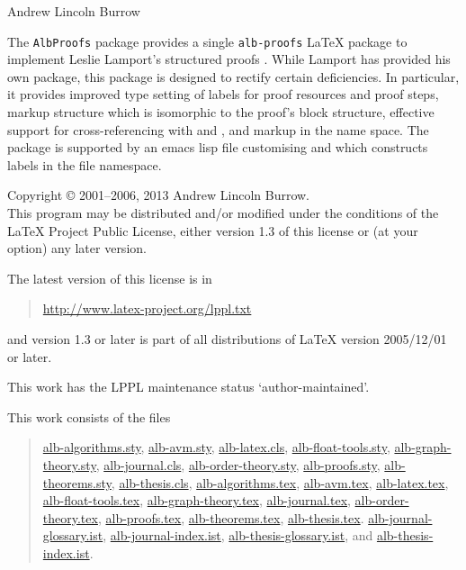 \documentclass[11pt,a4paper,oneside,titlepage]{alb-latex}
\begin{document}



\begin{albTitlePage}


  Andrew Lincoln Burrow


  The \texttt{AlbProofs} package provides a single \texttt{alb-proofs}
  \LaTeX{} package to implement Leslie Lamport's structured proofs
  \citep{lamport93:_how_write_proof}.  While Lamport has provided his
  own package, this package is designed to rectify certain deficiencies.
  In particular, it provides improved type setting of labels for proof
  resources and proof steps, markup structure which is isomorphic to the
  proof's block structure, effective support for cross-referencing with
  \AUCTeX{} and \RefTeX{}, and markup in the \albLogo{} name space.  The
  package is supported by an emacs lisp file customising \AUCTeX{} and
  \RefTeX{} which constructs labels in the file namespace.



  Copyright \copyright{} 2001--2006, 2013 Andrew Lincoln Burrow.\\
  This program may be distributed and/or modified under the conditions
  of the \LaTeX{} Project Public License, either version 1.3 of this
  license or (at your option) any later version.

  \medskip{}

  The latest version of this license is in
  \begin{quote}
    \url{http://www.latex-project.org/lppl.txt}
  \end{quote}
  and version 1.3 or later is part of all distributions of LaTeX version
  2005/12/01 or later.

  \medskip{}

  This work has the LPPL maintenance status `author-maintained'.

  \medskip{}

  This work consists of the files
  \begin{quote}
    \begin{flushleft}
      \url{alb-algorithms.sty}, \url{alb-avm.sty}, \url{alb-latex.cls},
      \url{alb-float-tools.sty}, \url{alb-graph-theory.sty},
      \url{alb-journal.cls}, \url{alb-order-theory.sty},
      \url{alb-proofs.sty}, \url{alb-theorems.sty},
      \url{alb-thesis.cls}, \url{alb-algorithms.tex}, \url{alb-avm.tex},
      \url{alb-latex.tex}, \url{alb-float-tools.tex},
      \url{alb-graph-theory.tex}, \url{alb-journal.tex},
      \url{alb-order-theory.tex}, \url{alb-proofs.tex},
      \url{alb-theorems.tex}, \url{alb-thesis.tex}.
      \url{alb-journal-glossary.ist}, \url{alb-journal-index.ist},
      \url{alb-thesis-glossary.ist}, and \url{alb-thesis-index.ist}.
    \end{flushleft}
  \end{quote}



\end{albTitlePage}
\end{document}
